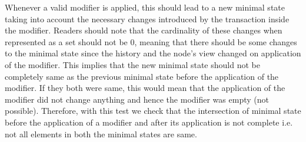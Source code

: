 \begin{enumerate}[\IEEEsetlabelwidth{Z}]
\begin{itemize}[]
Whenever a valid modifier is applied, this should lead to a new minimal state taking into account the necessary changes introduced by the transaction inside the modifier. Readers should note that the cardinality of these changes when represented as a set should not be 0, meaning that there should be some changes to the minimal state since the history and the node's view changed on application of the modifier. This implies that the new minimal state should not be completely same as the previous minimal state before the application of the modifier. If they both were same, this would mean that the application of the modifier did not change anything and hence the modifier was empty (not possible). Therefore, with this test we check that the intersection of minimal state before the application of a modifier and after its application is not complete i.e. not all elements in both the minimal states are same.
\end{itemize}
\end{enumerate}



